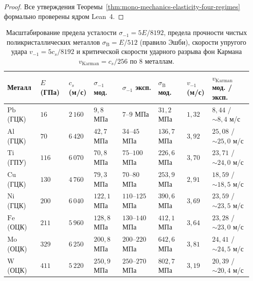 \begin{proof}
\leanok
Все утверждения Теоремы~\ref{thm:mono-mechanics-elasticity-four-regimes} формально проверены ядром Lean~4.
\end{proof}

\begin{table}[htbp]
\centering
\caption{Масштабирование предела усталости $\sigma_{-1} = 5E/8192$, предела прочности чистых поликристаллических металлов $\sigma_{\mathrm{B}} = E/512$ (правило Эшби), скорости упругого удара $v_{-1} = 5c_s/8192$ и критической скорости ударного разрыва фон Кармана $v_{\mathrm{Karman}} = c_s/256$ по 8 металлам.}
\label{tab:mono-eight-metals-karman}
\small
\begin{tabular}{@{}llllllll@{}}
\toprule
\textbf{Металл} & \textbf{$E$ (ГПа)} & \textbf{$c_s$ (м/с)} & \textbf{$\sigma_{-1}$ мод.} & \textbf{$\sigma_{-1}$ эксп.} & \textbf{$\sigma_{\mathrm{B}}$ мод.} & \textbf{$v_{-1}$ (м/с)} & \textbf{$v_{\mathrm{Karman}}$ мод. / эксп.} \\
\midrule
$\mathrm{Pb}$ (ГЦК) & $16$ & $2\,160$ & $9{,}8$ МПа & $7\text{--}9$ МПа & $31{,}2$ МПа & $1{,}32$ & $8{,}44$ / $\sim 8{,}4$ м/с \\
$\mathrm{Al}$ (ГЦК) & $70$ & $6\,420$ & $42{,}7$ МПа & $34\text{--}45$ МПа & $136{,}7$ МПа & $3{,}92$ & $25{,}08$ / $\sim 25{,}0$ м/с \\
$\mathrm{Ti}$ (ГПУ) & $116$ & $6\,070$ & $70{,}8$ МПа & $75\text{--}100$ МПа & $226{,}6$ МПа & $3{,}70$ & $23{,}71$ / $\sim 24{,}0$ м/с \\
$\mathrm{Cu}$ (ГЦК) & $130$ & $4\,760$ & $79{,}3$ МПа & $70\text{--}80$ МПа & $253{,}9$ МПа & $2{,}91$ & $18{,}59$ / $\sim 18{,}5$ м/с \\
$\mathrm{Ni}$ (ГЦК) & $200$ & $6\,040$ & $122{,}1$ МПа & $110\text{--}125$ МПа & $390{,}6$ МПа & $3{,}69$ & $23{,}59$ / $\sim 23{,}5$ м/с \\
$\mathrm{Fe}$ (ОЦК) & $211$ & $5\,960$ & $128{,}8$ МПа & $130\text{--}140$ МПа & $412{,}1$ МПа & $3{,}64$ & $23{,}28$ / $\sim 23{,}0$ м/с \\
$\mathrm{Mo}$ (ОЦК) & $329$ & $6\,250$ & $200{,}8$ МПа & $200\text{--}220$ МПа & $642{,}6$ МПа & $3{,}81$ & $24{,}41$ / $\sim 24{,}5$ м/с \\
$\mathrm{W}$ (ОЦК)  & $411$ & $5\,220$ & $250{,}9$ МПа & $250\text{--}270$ МПа & $802{,}7$ МПа & $3{,}19$ & $20{,}39$ / $\sim 20{,}4$ м/с \\
\bottomrule
\end{tabular}
\end{table}

